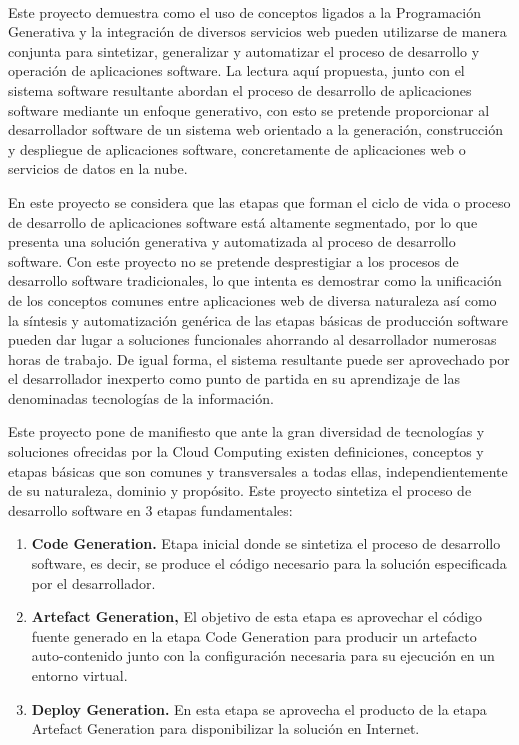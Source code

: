 
\vspace{0.7cm}
\\


Este proyecto demuestra como el uso de conceptos ligados a la  Programación Generativa y la integración de diversos servicios web pueden utilizarse de manera conjunta para sintetizar, generalizar y automatizar el proceso de desarrollo y operación de aplicaciones software. La lectura aquí propuesta, junto con el sistema software resultante abordan  el proceso de desarrollo de aplicaciones software mediante un enfoque generativo, con esto  se pretende proporcionar al desarrollador software de un sistema web orientado a la generación, construcción y despliegue de aplicaciones software, concretamente de aplicaciones  web o servicios de datos en la nube.
 
 En este proyecto se considera que las etapas que forman el ciclo de vida o proceso de desarrollo de aplicaciones software está altamente segmentado, por lo que presenta una solución generativa y automatizada al proceso de desarrollo software. Con este proyecto no se pretende desprestigiar a los procesos de desarrollo software tradicionales, lo que intenta es demostrar como la unificación de los conceptos comunes entre aplicaciones web de diversa naturaleza así como la síntesis y  automatización genérica de las etapas básicas de producción software pueden dar lugar a soluciones funcionales ahorrando al desarrollador numerosas horas de trabajo. De igual forma, el sistema resultante  puede ser aprovechado por el desarrollador inexperto como punto de partida en su aprendizaje de las denominadas tecnologías de la información.
 
 
Este proyecto pone de manifiesto que ante la gran diversidad de tecnologías y soluciones ofrecidas por la Cloud Computing  existen definiciones, conceptos y  etapas básicas que son  comunes  y transversales  a todas ellas, independientemente de su naturaleza, dominio y propósito. Este proyecto sintetiza el proceso de desarrollo software en 3 etapas fundamentales: 

\begin{enumerate}
\item \textbf{ Code Generation. }  Etapa inicial donde se sintetiza el proceso de desarrollo software, es decir, se produce el código necesario para la solución especificada por el desarrollador. 
\item \textbf{ Artefact Generation, }  El objetivo de esta etapa es aprovechar el código fuente generado en la etapa Code Generation para producir un artefacto auto-contenido junto con la configuración necesaria para su ejecución en un entorno virtual. 
\item \textbf{ Deploy Generation. } En esta etapa se aprovecha el producto de la etapa Artefact Generation para disponibilizar la solución en Internet. 
\end{enumerate}
 

